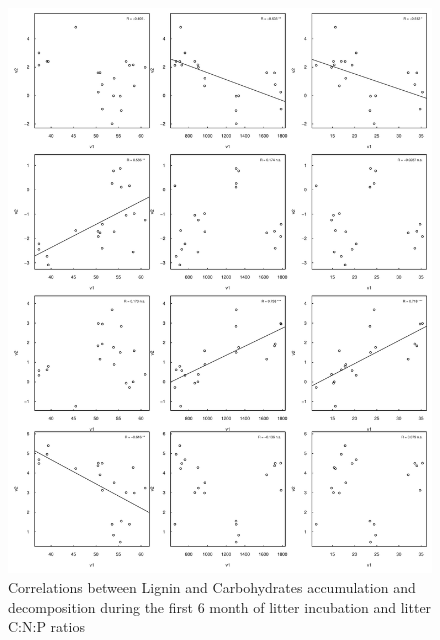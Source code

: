 \documentclass[authoryear,preprint,review,12pt]{elsarticle}
\begin{document}
\newpage
\begin{figure}[h!]
\vspace*{2mm}
\begin{center}
\includegraphics{sbb-graphcorr2}
\end{center}
\caption{Correlations between Lignin and Carbohydrates accumulation and decomposition during the first 6 month of litter incubation and litter C:N:P ratios}
\label{fig:cor2}
\end{figure}
\end{document}

